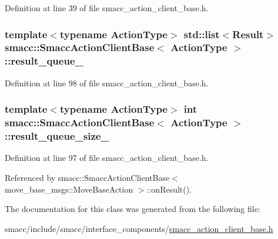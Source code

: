 Definition at line 39 of file smacc\+\_\+action\+\_\+client\+\_\+base.\+h.

\subsubsection[{\texorpdfstring{result\+\_\+queue\+\_\+}{result_queue_}}]{\setlength{\rightskip}{0pt plus 5cm}template$<$typename Action\+Type$>$ std\+::list$<$Result$>$ {\bf smacc\+::\+Smacc\+Action\+Client\+Base}$<$ Action\+Type $>$\+::result\+\_\+queue\+\_\+\hspace{0.3cm}{\ttfamily [protected]}}\hypertarget{classsmacc_1_1SmaccActionClientBase_a42c2e070235e6eeaca970c2abaeabec4}{}\label{classsmacc_1_1SmaccActionClientBase_a42c2e070235e6eeaca970c2abaeabec4}


Definition at line 98 of file smacc\+\_\+action\+\_\+client\+\_\+base.\+h.

\subsubsection[{\texorpdfstring{result\+\_\+queue\+\_\+size\+\_\+}{result_queue_size_}}]{\setlength{\rightskip}{0pt plus 5cm}template$<$typename Action\+Type$>$ {\bf int} {\bf smacc\+::\+Smacc\+Action\+Client\+Base}$<$ Action\+Type $>$\+::result\+\_\+queue\+\_\+size\+\_\+\hspace{0.3cm}{\ttfamily [protected]}}\hypertarget{classsmacc_1_1SmaccActionClientBase_af3a3ef9ababeaf43ed283234657c936a}{}\label{classsmacc_1_1SmaccActionClientBase_af3a3ef9ababeaf43ed283234657c936a}


Definition at line 97 of file smacc\+\_\+action\+\_\+client\+\_\+base.\+h.



Referenced by smacc\+::\+Smacc\+Action\+Client\+Base$<$ move\+\_\+base\+\_\+msgs\+::\+Move\+Base\+Action $>$\+::on\+Result().



The documentation for this class was generated from the following file\+:\begin{DoxyCompactItemize}
\item 
smacc/include/smacc/interface\+\_\+components/\hyperlink{smacc__action__client__base_8h}{smacc\+\_\+action\+\_\+client\+\_\+base.\+h}\end{DoxyCompactItemize}
